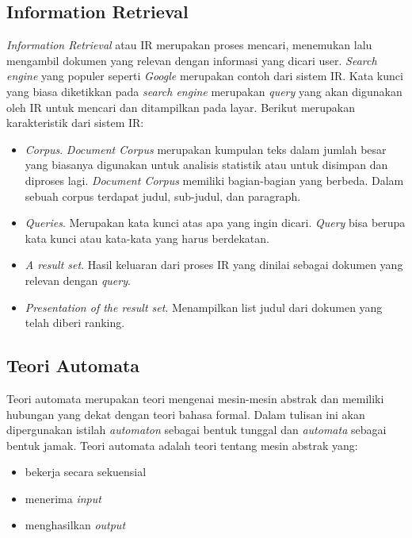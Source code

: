\subsection{Information Retrieval\cite{kowalski2010information}}
\label{sec:ir}

\textit{Information Retrieval} atau IR merupakan proses mencari, menemukan lalu mengambil dokumen yang relevan dengan informasi yang dicari user. \textit{Search engine} yang populer seperti \textit{Google} merupakan contoh dari sistem IR. Kata kunci yang biasa diketikkan pada \textit{search engine} merupakan \textit{query} yang akan digunakan oleh IR untuk mencari dan ditampilkan pada layar. Berikut merupakan karakteristik dari sistem IR:

\begin{itemize}
	\item \textit{Corpus}. \textit{Document Corpus} merupakan kumpulan teks dalam jumlah besar yang biasanya digunakan untuk analisis statistik atau untuk disimpan dan diproses lagi. \textit{Document Corpus} memiliki bagian-bagian yang berbeda. Dalam sebuah corpus terdapat judul, sub-judul, dan paragraph.
	\item \textit{Queries}. Merupakan kata kunci atas apa yang ingin dicari. \textit{Query} bisa berupa kata kunci atau kata-kata yang harus berdekatan.
	\item \textit{A result set}. Hasil keluaran dari proses IR yang dinilai sebagai dokumen yang relevan dengan \textit{query}.
	\item \textit{Presentation of the result set}. Menampilkan list judul dari dokumen yang telah diberi ranking.
\end{itemize}

\subsection{Teori Automata\cite{Frisca:2014}}
Teori automata merupakan teori mengenai mesin-mesin abstrak dan memiliki hubungan yang dekat dengan teori bahasa formal. Dalam tulisan ini akan dipergunakan istilah \textit{automaton} sebagai bentuk tunggal dan \textit{automata} sebagai bentuk jamak. Teori automata adalah teori tentang mesin abstrak yang:

\begin{itemize}
	\item bekerja secara sekuensial
	\item menerima \textit{input}
	\item menghasilkan \textit{output}
\end{itemize}

